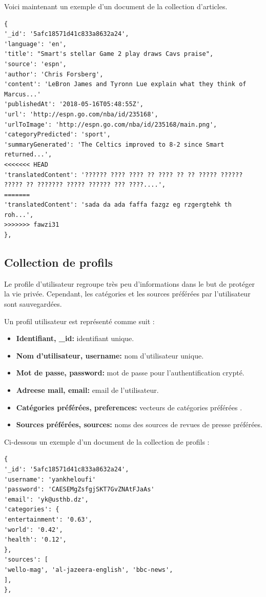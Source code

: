 Voici maintenant un exemple d'un document de la collection d'articles.
\begin{lstlisting}[style=code]
{
'_id': '5afc18571d41c833a8632a24', 
'language': 'en',
'title': "Smart's stellar Game 2 play draws Cavs praise", 
'source': 'espn', 
'author': 'Chris Forsberg', 
'content': 'LeBron James and Tyronn Lue explain what they think of Marcus...'
'publishedAt': '2018-05-16T05:48:55Z', 
'url': 'http://espn.go.com/nba/id/235168',
'urlToImage': 'http://espn.go.com/nba/id/235168/main.png',  
'categoryPredicted': 'sport', 
'summaryGenerated': 'The Celtics improved to 8-2 since Smart returned...', 
<<<<<<< HEAD
'translatedContent': '?????? ???? ???? ?? ???? ?? ?? ????? ?????? ????? ?? ??????? ????? ?????? ??? ????....', 
=======
'translatedContent': 'sada da ada faffa fazgz eg rzgergtehk th roh...', 
>>>>>>> fawzi31
},
\end{lstlisting}

\subsection{Collection de profils}
Le profile d'utilisateur regroupe très peu d'informations dans le but de protéger la vie privée. Cependant, les catégories et les sources préférées par l'utilisateur sont sauvegardées. 

Un profil utilisateur est représenté comme suit :
\begin{itemize}
    \item \textbf{Identifiant, \textquotedbl  \_id\textquotedbl : } identifiant unique.
    \item \textbf{Nom d'utilisateur, \textquotedbl  username\textquotedbl : } nom d'utilisateur unique.
    \item \textbf{Mot de passe, \textquotedbl  password\textquotedbl : } mot de passe pour l'authentification crypté.
    \item \textbf{Adreese mail, \textquotedbl  email\textquotedbl : } email de l'utilisateur.
    \item \textbf{Catégories préférées, \textquotedbl  preferences\textquotedbl : } vecteurs de catégories préférées .
    \item \textbf{Sources préférées, \textquotedbl  sources\textquotedbl : } noms des sources de revues de presse préférées. 
\end{itemize}

Ci-dessous un exemple d'un document de la collection de profils :
\begin{lstlisting}[style=code]
{
'_id': '5afc18571d41c833a8632a24', 
'username': 'yankheloufi'
'password': 'CAESEMgZsfgjSKT7GvZNAtFJaAs'
'email': 'yk@usthb.dz',
'categories': {
'entertainment': '0.63',
'world': '0.42',
'health': '0.12',
},
'sources': [
'wello-mag', 'al-jazeera-english', 'bbc-news', 
],
},
\end{lstlisting}


